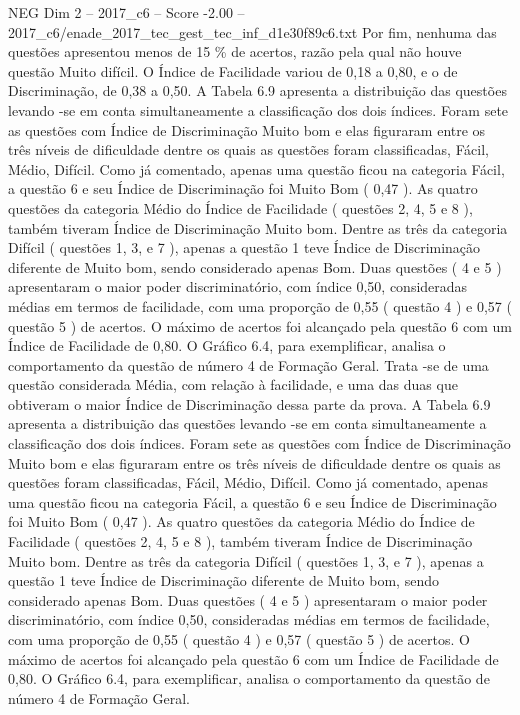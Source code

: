 \begin{textsample}{NEG Dim 2 – 2017\_c6 – Score -2.00 – 2017\_c6/enade\_2017\_tec\_gest\_tec\_inf\_d1e30f89c6.txt}
Por fim, nenhuma das questões apresentou menos de 15 \% de acertos, razão pela qual não houve questão Muito difícil.
O Índice de Facilidade variou de 0,18 a 0,80, e o de Discriminação, de 0,38 a 0,50.
A Tabela 6.9 apresenta a distribuição das questões levando -se em conta simultaneamente a classificação dos dois índices.
Foram sete as questões com Índice de Discriminação Muito bom e elas figuraram entre os três níveis de dificuldade dentre os quais as questões foram classificadas, Fácil, Médio, Difícil.
Como já comentado, apenas uma questão ficou na categoria Fácil, a questão 6 e seu Índice de Discriminação foi Muito Bom ( 0,47 ).
As quatro questões da categoria Médio do Índice de Facilidade ( questões 2, 4, 5 e 8 ), também tiveram Índice de Discriminação Muito bom.
Dentre as três da categoria Difícil ( questões 1, 3, e 7 ), apenas a questão 1 teve Índice de Discriminação diferente de Muito bom, sendo considerado apenas Bom.
Duas questões ( 4 e 5 ) apresentaram o maior poder discriminatório, com índice 0,50, consideradas médias em termos de facilidade, com uma proporção de 0,55 ( questão 4 ) e 0,57 ( questão 5 ) de acertos.
O máximo de acertos foi alcançado pela questão 6 com um Índice de Facilidade de 0,80.
O Gráfico 6.4, para exemplificar, analisa o comportamento da questão de número 4 de Formação Geral.
Trata -se de uma questão considerada Média, com relação à facilidade, e uma das duas que obtiveram o maior Índice de Discriminação dessa parte da prova.
A Tabela 6.9 apresenta a distribuição das questões levando -se em conta simultaneamente a classificação dos dois índices.
Foram sete as questões com Índice de Discriminação Muito bom e elas figuraram entre os três níveis de dificuldade dentre os quais as questões foram classificadas, Fácil, Médio, Difícil.
Como já comentado, apenas uma questão ficou na categoria Fácil, a questão 6 e seu Índice de Discriminação foi Muito Bom ( 0,47 ).
As quatro questões da categoria Médio do Índice de Facilidade ( questões 2, 4, 5 e 8 ), também tiveram Índice de Discriminação Muito bom.
Dentre as três da categoria Difícil ( questões 1, 3, e 7 ), apenas a questão 1 teve Índice de Discriminação diferente de Muito bom, sendo considerado apenas Bom.
Duas questões ( 4 e 5 ) apresentaram o maior poder discriminatório, com índice 0,50, consideradas médias em termos de facilidade, com uma proporção de 0,55 ( questão 4 ) e 0,57 ( questão 5 ) de acertos.
O máximo de acertos foi alcançado pela questão 6 com um Índice de Facilidade de 0,80.
O Gráfico 6.4, para exemplificar, analisa o comportamento da questão de número 4 de Formação Geral.

\end{textsample}
